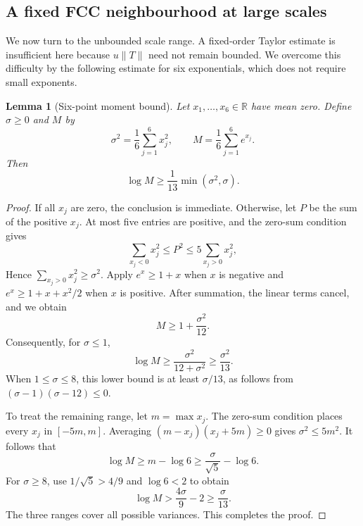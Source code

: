 \documentclass[reqno,english]{amsart}
\newtheorem{lemma}[theorem]{Lemma}
\theoremstyle{definition}
\newtheorem{open problem}[theorem]{Open Problem}
\theoremstyle{remark}
\theoremstyle{plain}
\newcommand{\R}{{\mathbb R}}
\numberwithin{equation}{section}
\begin{document}
\subsection{A fixed FCC neighbourhood at large scales}
We now turn to the unbounded scale range. A fixed-order Taylor
estimate is insufficient here because $u\|T\|$ need not remain
bounded. We overcome this difficulty by the following estimate for
six exponentials, which does not require small exponents.

\begin{lemma}[Six-point moment bound]\label{T:lem:mgf}
Let $x_1,\ldots,x_6\in\R$ have mean zero. Define $\sigma\ge0$ and $M$ by
\[
 \sigma^2=\frac16\sum_{j=1}^6x_j^2,
 \qquad M=\frac16\sum_{j=1}^6e^{x_j}.
\]
Then
\begin{equation}\label{T:eq:mgf}
 \log M\ge\frac1{13}\min(\sigma^2,\sigma).
\end{equation}
\end{lemma}
\begin{proof}
If all $x_j$ are zero, the conclusion is immediate. Otherwise,
let $P$ be the sum of the positive $x_j$. At most five entries are
positive, and the zero-sum condition gives
\[
 \sum_{x_j<0}x_j^2\le P^2
 \le5\sum_{x_j>0}x_j^2,
\]
Hence $\sum_{x_j>0}x_j^2\ge\sigma^2$. Apply $e^x\ge1+x$ when
$x$ is negative and $e^x\ge1+x+x^2/2$ when $x$ is positive.
After summation, the linear terms cancel, and we obtain
\begin{equation}\label{T:eq:mgfquad}
 M\ge1+\frac{\sigma^2}{12}.
\end{equation}
Consequently, for $\sigma\le1$,
\[
 \log M\ge\frac{\sigma^2}{12+\sigma^2}\ge\frac{\sigma^2}{13}.
\]
When $1\le\sigma\le8$, this lower bound is at least $\sigma/13$,
as follows from $(\sigma-1)(\sigma-12)\le0$.

To treat the remaining range, let $m=\max x_j$. The zero-sum
condition places every $x_j$ in $[-5m,m]$. Averaging
$(m-x_j)(x_j+5m)\ge0$ gives $\sigma^2\le5m^2$. It follows that
\[
 \log M\ge m-\log6\ge\frac{\sigma}{\sqrt5}-\log6.
\]
For $\sigma\ge8$, use $1/\sqrt5>4/9$ and $\log6<2$ to obtain
\[
 \log M>\frac{4\sigma}{9}-2\ge\frac{\sigma}{13}.
\]
The three ranges cover all possible variances. This completes the proof.
\end{proof}
\end{document}
